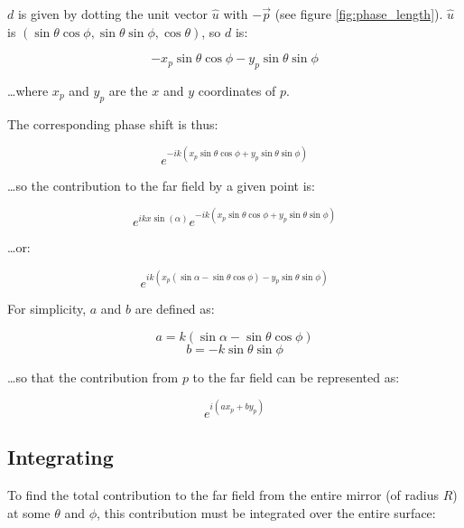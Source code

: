 \documentclass[etd,senior,noacknowledgments]{BYUPhys}
\begin{document}
$d$ is given by dotting the unit vector $\hat{u}$ with $-\vec{p}$ (see figure \ref{fig:phase_length}). $\hat{u}$ is $\left(\sin{\theta}\cos{\phi},\sin{\theta}\sin{\phi},\cos{\theta}\right)$, so $d$ is:

\begin{equation}
  -x_p\sin{\theta}\cos{\phi}-y_p\sin{\theta}\sin{\phi}
\end{equation}

\ldots where $x_p$ and $y_p$ are the $x$ and $y$ coordinates of $p$.

The corresponding phase shift is thus:

\begin{equation}
  e^{-ik(x_p\sin{\theta}\cos{\phi}+y_p\sin{\theta}\sin{\phi})}
\end{equation}

\ldots so the contribution to the far field by a given point is:

\begin{equation}
  e^{ikx\sin\left({\alpha}\right)}e^{-ik(x_p\sin{\theta}\cos{\phi}+y_p\sin{\theta}\sin{\phi})}
\end{equation}

\ldots or:

\begin{equation}
  e^{ik\left(x_p(\sin{\alpha}-\sin{\theta}\cos{\phi})-y_p\sin{\theta}\sin{\phi}\right)}
\end{equation}

For simplicity, $a$ and $b$ are defined as:

\begin{equation} \label{eq:a}
  a = k\left(\sin{\alpha}-\sin{\theta}\cos{\phi}\right)
\end{equation}
\begin{equation} \label{eq:b}
  b = -k\sin{\theta}\sin{\phi}
\end{equation}

\ldots so that the contribution from $p$ to the far field can be represented as:

\begin{equation}
  e^{i(ax_p+by_p)}
\end{equation}

\subsection{Integrating} \label{sec:integrating}

To find the total contribution to the far field from the entire mirror (of radius $R$) at some $\theta$ and $\phi$, this contribution must be integrated over the entire surface:
\end{document}
